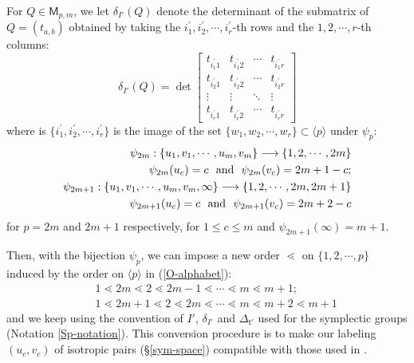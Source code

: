 \documentclass[11pt]{amsart}
\numberwithin{equation}{subsection}
\begin{document}
For $Q \in \mathsf{M}_{p,m}$, 
we let ${\delta}_{I'}(Q)$ denote the determinant of the submatrix of 
$Q=(t_{a,b})$ obtained by taking 
the $i_{1}^{\prime} , i_{2}^{\prime} , \cdots , i_{r}^{\prime} $-th rows 
and the $1,2,\cdots ,r$-th columns:
\begin{equation}\label{O_determinant}
{\delta} _{I'}(Q)=\det 
\begin{bmatrix}
t_{i_{1}^{\prime} 1} & t_{i_{1}^{\prime}  2} & \cdots & t_{i_{1}^{\prime}  r}
\\ 
t_{i_{2}^{\prime}  1} & t_{i_{2}^{\prime}  2} & \cdots & t_{i_{2}^{\prime} r}
\\ 
\vdots & \vdots & \ddots & \vdots \\ 
t_{i_{r}^{\prime}  1} & t_{i_{r}^{\prime}  2} & \cdots & t_{i_{r}^{\prime}  r}\end{bmatrix}
\end{equation}
where  is $\{ i_{1}^{\prime}, i_{2}^{\prime}, \cdots , i_{r}^{\prime} \}$ is the image of 
the set $\{ w_1, w_2, \cdots, w_r \} \subset \langle p \rangle$ under $\psi_p$:
\begin{eqnarray}\label{SO-psi}
\psi_{2m}:\{u_1, v_1 ,\cdots, u_m, v_m \} \longrightarrow \{1, 2, \cdots, 2m \} \\
\psi_{2m}(u_c)=c \hbox{ \ and \ } \psi_{2m}(v_c)=2m+1-c ; \notag \\ 
\psi_{2m+1}:\{u_1, v_1 ,\cdots, u_m, v_m , \infty \} \longrightarrow \{1, 2, \cdots, 2m , 2m+1\} \notag \\  
\psi_{2m+1}(u_c)=c \hbox{ \ and \ } \psi_{2m+1}(v_c)=2m+2-c  \notag
\end{eqnarray}
for $p=2m$ and $2m+1$ respectively, for $1 \leq c \leq m$ and $\psi_{2m+1}(\infty)=m+1$. 

Then, with the bijection $\psi_p$, we can impose a new order $\lessdot$ on 
$\{1, 2, \cdots, p \}$ induced by the order on $\langle p \rangle$ in (\ref{O-alphabet}):
\begin{eqnarray*}
&& 1 \lessdot 2m \lessdot 2 \lessdot 2m-1 \lessdot \cdots \lessdot m \lessdot m+1; \\
&& 1 \lessdot 2m+1 \lessdot 2 \lessdot 2m \lessdot \cdots \lessdot m \lessdot m+2 \lessdot m+1 
\end{eqnarray*}
and we keep using the convention of $I'$, $\delta_{I'}$ and $\Delta_{\mathsf{t}'}$ 
used for the symplectic groups (Notation \ref{Sp-notation}). This conversion procedure is to make our labeling $(u_c, v_c)$ of isotropic pairs (\S \ref{sym-space}) compatible with those used
in \cite{KW93, Ki09}.
\end{document}
